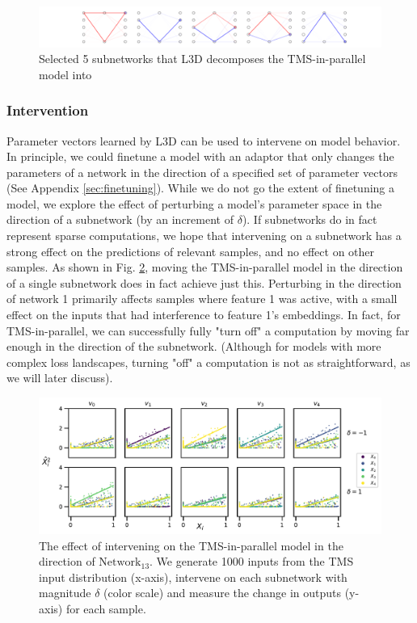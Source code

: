\documentclass{article}
\theoremstyle{plain}
\theoremstyle{definition}
\theoremstyle{remark}
\begin{document}
\begin{figure}
    \centerline{\includegraphics[width=\textwidth]{../figures/3_tms_first_5_subnetworks.pdf}}
    \centering
    \caption{Selected 5 subnetworks that L3D decomposes the TMS-in-parallel model into}\label{fig:3_tms_subnetworks_first5}
\end{figure}


\subsubsection{Intervention}

Parameter vectors learned by L3D can be used to intervene on model behavior. In principle, we could finetune a model with an adaptor that only changes the parameters of a network in the direction of a specified set of parameter vectors (See Appendix \ref{sec:finetuning}). While we do not go the extent of finetuning a model, we explore the effect of perturbing a model's parameter space in the direction of a subnetwork (by an increment of $\delta$). If subnetworks do in fact represent sparse computations, we hope that intervening on a subnetwork has a strong effect on the predictions of relevant samples, and no effect on other samples. As shown in Fig. \ref{fig:4_tms_intervention}, moving the TMS-in-parallel model in the direction of a single subnetwork does in fact achieve just this. Perturbing in the direction of network 1 primarily affects samples where feature 1 was active, with a small effect on the inputs that had interference to feature 1's embeddings. In fact, for TMS-in-parallel, we can successfully fully "turn off" a computation by moving far enough in the direction of the subnetwork. (Although for models with more complex loss landscapes, turning "off" a computation is not as straightforward, as we will later discuss).

\begin{figure}
    \centerline{\includegraphics[width=\columnwidth]{../figures/4_tms_intervention.pdf}}
    \centering
    \caption{The effect of intervening on the TMS-in-parallel model in the direction of $\text{Network}_13$. We generate 1000 inputs from the TMS input distribution (x-axis), intervene on each subnetwork with magnitude $\delta$ (color scale) and measure the change in outputs (y-axis) for each sample.}\label{fig:4_tms_intervention}
\end{figure}
\end{document}
